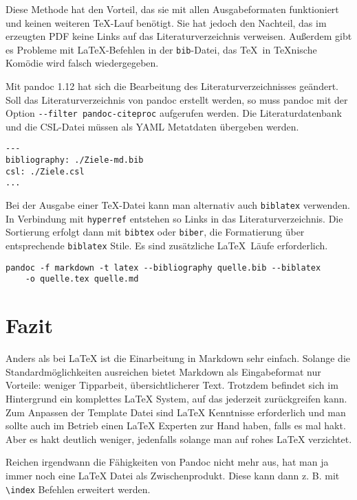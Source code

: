 \documentclass[11pt,ngerman,a4paper]{article}
\begin{document}
Diese Methode hat den Vorteil, das sie mit allen Ausgabeformaten
funktioniert und keinen weiteren TeX-Lauf benötigt. Sie hat jedoch den
Nachteil, das im erzeugten PDF keine Links auf das Literaturverzeichnis
verweisen. Außerdem gibt es Probleme mit LaTeX-Befehlen in der
\texttt{bib}-Datei, das TeX~in TeXnische Komödie wird falsch
wiedergegeben.

Mit pandoc 1.12 hat sich die Bearbeitung des Literaturverzeichnisses
geändert. Soll das Literaturverzeichnis von pandoc erstellt werden, so
muss pandoc mit der Option \texttt{-{}-filter pandoc-citeproc}
aufgerufen werden. Die Literaturdatenbank und die CSL-Datei müssen als
YAML Metatdaten übergeben werden.

\begin{verbatim}
---
bibliography: ./Ziele-md.bib
csl: ./Ziele.csl
...
\end{verbatim}

Bei der Ausgabe einer TeX-Datei kann man alternativ auch
\texttt{biblatex} verwenden. In Verbindung mit \texttt{hyperref}
entstehen so Links in das Literaturverzeichnis. Die Sortierung erfolgt
dann mit \texttt{bibtex} oder \texttt{biber}, die Formatierung über
entsprechende \texttt{biblatex} Stile. Es sind zusätzliche LaTeX~Läufe
erforderlich.

\begin{verbatim}
pandoc -f markdown -t latex --bibliography quelle.bib --biblatex 
    -o quelle.tex quelle.md
\end{verbatim}

\section{Fazit}\label{fazit}

Anders als bei LaTeX ist die Einarbeitung in Markdown sehr einfach.
Solange die Standardmöglichkeiten ausreichen bietet Markdown als
Eingabeformat nur Vorteile: weniger Tipparbeit, übersichtlicherer Text.
Trotzdem befindet sich im Hintergrund ein komplettes LaTeX System, auf
das jederzeit zurückgreifen kann. Zum Anpassen der Template Datei sind
LaTeX Kenntnisse erforderlich und man sollte auch im Betrieb einen LaTeX
Experten zur Hand haben, falls es mal hakt. Aber es hakt deutlich
weniger, jedenfalls solange man auf rohes LaTeX verzichtet.

Reichen irgendwann die Fähigkeiten von Pandoc nicht mehr aus, hat man ja
immer noch eine LaTeX Datei als Zwischenprodukt. Diese kann dann z. B.
mit \texttt{\textbackslash{}index} Befehlen erweitert werden.
\end{document}
